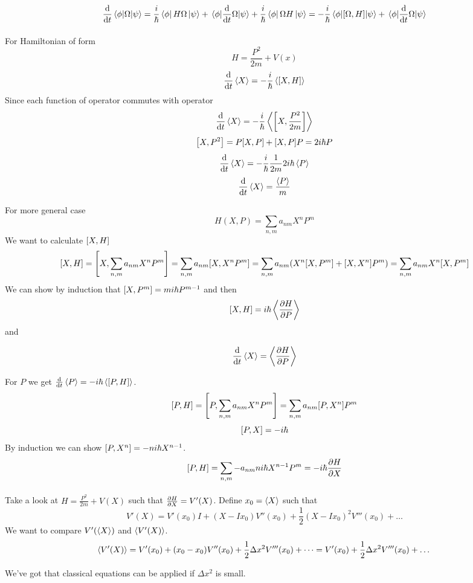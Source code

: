 $$\dv{t} \mel{\phi}{\Omega}{\psi}  = \frac{i}{\hbar} \bra{\phi} H \Omega \ket{\psi} + \mel{\phi}{\dv{t}\Omega}{\psi} +  \frac{i}{\hbar}\bra{\phi} \Omega H\ket{\psi} =-\frac{i}{\hbar} \mel{\phi}{\comm{\Omega}{H}}{\psi} + \mel{\phi}{\dv{t}\Omega}{\psi} $$
\paragraph{}
For Hamiltonian of form
$$H = \frac{P^2}{2m} + V(x)$$
$$\dv{t}\expval{X} = -\frac{i}{\hbar} \expval{\comm{X}{H}}$$
Since each function of operator commutes with operator
$$\dv{t}\expval{X} = -\frac{i}{\hbar} \expval{\comm{X}{\frac{P^2}{2m}}}$$
$$\comm{X}{P^2} =P\comm{X}{P} + \comm{X}{P}P = 2i\hbar P$$
$$\dv{t} \expval{X} = -\frac{i}{\hbar} \frac{1}{2m} 2i\hbar \expval{P} $$
$$\dv{t} \expval{X} =  \frac{\expval{P}}{m}   $$

For more general case
$$H(X,P) = \sum_{n,m} a_{nm} X^nP^m$$
We want to calculate $\comm{X}{H}$
$$\comm{X}{H} = \comm{X}{\sum_{n,m} a_{nm} X^nP^m} = \sum_{n,m} a_{nm}\comm{X}{ X^nP^m} = \sum_{n,m} a_{nm}\qty(X^n\comm{X}{ P^m}+\comm{X}{X^n }P^m)  = \sum_{n,m} a_{nm}X^n\comm{X}{ P^m}$$
We can show by induction that $\comm{X}{ P^m} = mi\hbar P^{m-1}$ and then
$$\comm{X}{H} =  i\hbar  \expval{\pdv{H}{P}}$$
and

$$\dv{t} \expval{X} =  \expval{\pdv{H}{P}} $$

For $P$ we get $\dv{t} \expval{P} = -i\hbar \expval{\comm{P}{H}}$.
$$\comm{P}{H} = \comm{P}{\sum_{n,m} a_{nm} X^nP^m} = \sum_{n,m} a_{nm}\comm{P}{ X^n}P^m$$
$$\comm{P}{X} = -i\hbar$$
By induction we can show $\comm{P}{X^n} = -ni\hbar X^{n-1}$.
$$\comm{P}{H} = \sum_{n,m} -a_{nm}ni\hbar X^{n-1}P^m = -i\hbar \pdv{H}{X}$$
\paragraph{} Take a look at $H = \frac{P^2}{2m} + V(X)$ such that $\pdv{H}{X} = V'(X)$. Define $x_0 = \expval{X}$ such that
$$V'(X) = V'(x_0) I + (X-Ix_0)V''(x_0) + \frac{1}{2}(X-Ix_0)^2V'''(x_0) + \dots$$
We want to compare $V'(\expval{X})$ and $\expval{V'(X)}$.
$$\expval{V'(X)} = V'(x_0) + (x_0-x_0)V''(x_0) + \frac{1}{2} \Delta x^2 V'''(x_0)+\dots = V'(x_0) +\frac{1}{2} \Delta x^2 V'''(x_0)+\dots$$

We've got that classical equations can be applied if $\Delta x^2$ is small.